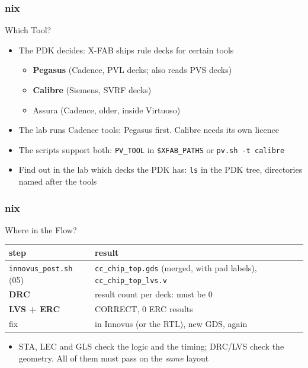 \documentclass{beamer}
\newcommand{\astitle}{nix}
\newcommand{\assubtitle}{nix}
\newcommand{\cmd}[1]{\texttt{#1}}
\begin{document}
\renewcommand{\assubtitle}{Which Tool?}
\begin{frame}
\frametitle{\astitle}
\begin{block}{\assubtitle}
  \begin{itemize}
    \item The PDK decides: X-FAB ships rule decks for certain tools
    \begin{itemize}
      \item \textbf{Pegasus} (Cadence, PVL decks; also reads PVS decks)
      \item \textbf{Calibre} (Siemens, SVRF decks)
      \item Assura (Cadence, older, inside Virtuoso)
    \end{itemize}
    \item The lab runs Cadence tools: Pegasus first. Calibre needs its
      own licence
    \item The scripts support both: \cmd{PV\_TOOL} in \cmd{\$XFAB\_PATHS}
      or \cmd{pv.sh -t calibre}
    \item Find out in the lab which decks the PDK has:
      \cmd{ls} in the PDK tree, directories named after the tools
  \end{itemize}
\end{block}
\end{frame}

\renewcommand{\assubtitle}{Where in the Flow?}
\begin{frame}
\frametitle{\astitle}
\begin{block}{\assubtitle}
  \footnotesize
  \begin{tabularx}{\linewidth}{@{}lY@{}}
    \textbf{step} & \textbf{result}\\\hline
    \cmd{innovus\_post.sh} (05) & \cmd{cc\_chip\_top.gds} (merged, with pad
                                labels), \cmd{cc\_chip\_top\_lvs.v}\\
    \textbf{DRC}              & result count per deck: must be 0\\
    \textbf{LVS + ERC}        & CORRECT, 0 ERC results\\
    fix                       & in Innovus (or the RTL), new GDS, again\\
  \end{tabularx}
  \vspace{4pt}
  \begin{itemize}
    \item STA, LEC and GLS check the logic and the timing; DRC/LVS check
      the geometry. All of them must pass on the \emph{same} layout
  \end{itemize}
\end{block}
\end{frame}
\end{document}

